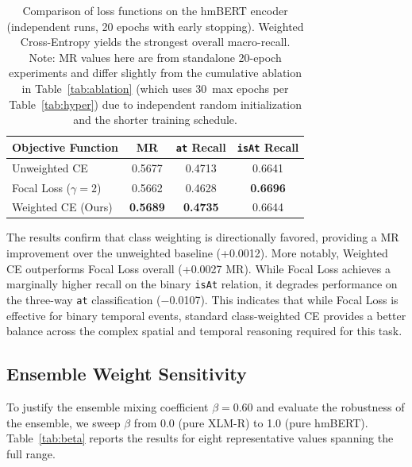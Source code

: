 \documentclass[11pt,a4paper]{article}
\begin{document}
\begin{table}[t]
\centering
\caption{Comparison of loss functions on the hmBERT encoder (independent runs, 20 epochs with early stopping). Weighted Cross-Entropy yields the strongest overall macro-recall. Note: MR values here are from standalone 20-epoch experiments and differ slightly from the cumulative ablation in Table~\ref{tab:ablation} (which uses 30~max epochs per Table~\ref{tab:hyper}) due to independent random initialization and the shorter training schedule.}
\label{tab:loss_ablation}
\begin{tabular}{lccc}
\toprule
\textbf{Objective Function} & \textbf{MR} & \textbf{\texttt{at} Recall} & \textbf{\texttt{isAt} Recall} \\
\midrule
Unweighted CE & 0.5677 & 0.4713 & 0.6641 \\
Focal Loss ($\gamma=2$) & 0.5662 & 0.4628 & \textbf{0.6696} \\
Weighted CE (Ours) & \textbf{0.5689} & \textbf{0.4735} & 0.6644 \\
\bottomrule
\end{tabular}
\end{table}

The results confirm that class weighting is directionally favored, providing a MR improvement over the unweighted baseline (+0.0012). More notably, Weighted CE outperforms Focal Loss overall (+0.0027 MR). While Focal Loss achieves a marginally higher recall on the binary \texttt{isAt} relation, it degrades performance on the three-way \texttt{at} classification ($-$0.0107). This indicates that while Focal Loss is effective for binary temporal events, standard class-weighted CE provides a better balance across the complex spatial and temporal reasoning required for this task.

\subsection{Ensemble Weight Sensitivity}
\label{sec:beta_sensitivity}

To justify the ensemble mixing coefficient $\beta=0.60$ and evaluate the robustness of the ensemble, we sweep $\beta$ from 0.0 (pure XLM-R) to 1.0 (pure hmBERT). Table~\ref{tab:beta} reports the results for eight representative values spanning the full range.
\end{document}
